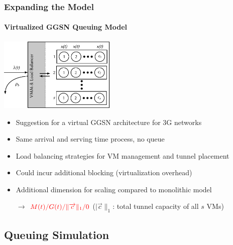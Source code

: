 \documentclass{beamer}
\begin{document}
\begin{frame}
	\frametitle{Expanding the Model}
	\framesubtitle{Virtualized GGSN Queuing Model}
		\begin{center}
			\includegraphics[height=3.5cm]{extras/ggsn-virtualized.pdf}
		\end{center}

		\begin{itemize}
			\item Suggestion for a virtual GGSN architecture for 3G networks
			\item Same arrival and serving time process, no queue
			\item Load balancing strategies for VM management and tunnel placement
			\item Could incur additional blocking (virtualization overhead)
			\item Additional dimension for scaling compared to monolithic model
			\item[$\rightarrow$] $\color{red}M(t)/G(t)/\|\overrightarrow{c}\|_1/0$ ($|\overrightarrow{c}\|_1$: total tunnel capacity of all $s$ VMs) %
		\end{itemize}
\end{frame}


\subsection{Queuing Simulation}
\end{document}
